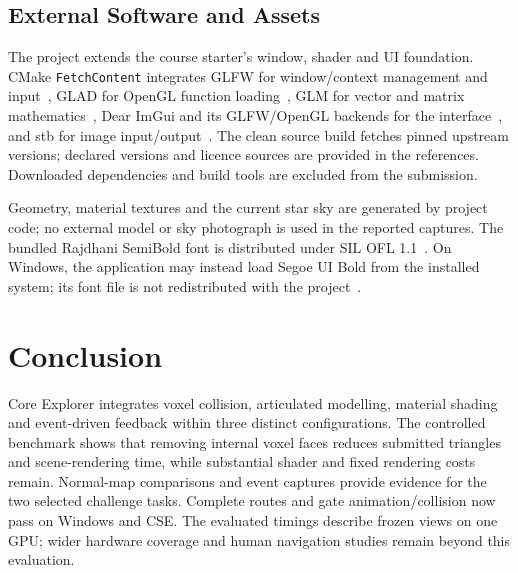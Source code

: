 \documentclass[10pt,a4paper,twocolumn]{article}
\newcommand{\code}[1]{\texttt{#1}}
\begin{document}
\subsection{External Software and Assets}
The project extends the course starter's window, shader and UI foundation. CMake \code{FetchContent} integrates GLFW for window/context management and input~\cite{glfw}, GLAD for OpenGL function loading~\cite{glad}, GLM for vector and matrix mathematics~\cite{glm}, Dear ImGui and its GLFW/OpenGL backends for the interface~\cite{imgui}, and stb for image input/output~\cite{stb}. The clean source build fetches pinned upstream versions; declared versions and licence sources are provided in the references. Downloaded dependencies and build tools are excluded from the submission.

Geometry, material textures and the current star sky are generated by project code; no external model or sky photograph is used in the reported captures. The bundled Rajdhani SemiBold font is distributed under SIL OFL 1.1~\cite{rajdhani}. On Windows, the application may instead load Segoe UI Bold from the installed system; its font file is not redistributed with the project~\cite{segoe}.

\section{Conclusion}
Core Explorer integrates voxel collision, articulated modelling, material shading and event-driven feedback within three distinct configurations. The controlled benchmark shows that removing internal voxel faces reduces submitted triangles and scene-rendering time, while substantial shader and fixed rendering costs remain. Normal-map comparisons and event captures provide evidence for the two selected challenge tasks. Complete routes and gate animation/collision now pass on Windows and CSE. The evaluated timings describe frozen views on one GPU; wider hardware coverage and human navigation studies remain beyond this evaluation.
\end{document}
